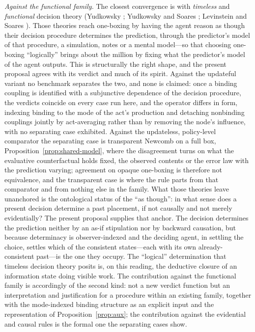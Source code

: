 \textit{Against the functional family.} The closest convergence is with \emph{timeless} and \emph{functional} decision theory (Yudkowsky \cite{yudkowsky2010tdt}; Yudkowsky and Soares \cite{soares2017fdt}; Levinstein and Soares \cite{levinstein2020cheating}). Those theories reach one-boxing by having the agent reason as though their decision procedure determines the prediction, through the predictor's model of that procedure, a simulation, notes or a mental model---so that choosing one-boxing ``logically'' brings about the million by fixing what the predictor's model of the agent outputs. This is structurally the right shape, and the present proposal agrees with its verdict and much of its spirit. Against the updateful variant no benchmark separates the two, and none is claimed: once a binding coupling is identified with a subjunctive dependence of the decision procedure, the verdicts coincide on every case run here, and the operator differs in form, indexing binding to the mode of the act's production and detaching nonbinding couplings jointly by act-averaging rather than by removing the node's influence, with no separating case exhibited. Against the updateless, policy-level comparator the separating case is transparent Newcomb on a full box, Proposition~\ref{prop:shared-model}, where the disagreement turns on what the evaluative counterfactual holds fixed, the observed contents or the error law with the prediction varying; agreement on opaque one-boxing is therefore not equivalence, and the transparent case is where the rule parts from that comparator and from nothing else in the family. What those theories leave unanchored is the ontological status of the ``as though'': in what sense does a present decision determine a past placement, if not causally and not merely evidentially? The present proposal supplies that anchor. The decision determines the prediction neither by an as-if stipulation nor by backward causation, but because determinacy is observer-indexed and the deciding agent, in settling the choice, settles which of the consistent states---each with its own already-consistent past---is the one they occupy. The ``logical'' determination that timeless decision theory posits is, on this reading, the deductive closure of an information state doing visible work. The contribution against the functional family is accordingly of the second kind: not a new verdict function but an interpretation and justification for a procedure within an existing family, together with the mode-indexed binding structure as an explicit input and the representation of Proposition~\ref{prop:aux}; the contribution against the evidential and causal rules is the formal one the separating cases show.

